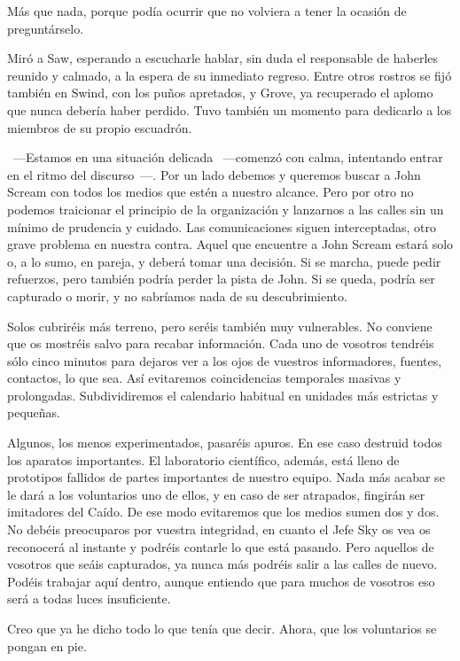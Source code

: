 Más que nada, porque podía ocurrir que no volviera a tener la ocasión de preguntárselo.

Miró a Saw, esperando a escucharle hablar, sin duda el responsable de haberles reunido y calmado, a la espera de su inmediato regreso. Entre otros rostros se fijó también en Swind, con los puños apretados, y Grove, ya recuperado el aplomo que nunca debería haber perdido. Tuvo también un momento para dedicarlo a los miembros de su propio escuadrón.

~---Estamos en una situación delicada ~---comenzó con calma, intentando entrar en el ritmo del discurso~---. Por un lado debemos y queremos buscar a John Scream con todos los medios que estén a nuestro alcance. Pero por otro no podemos traicionar el principio de la organización y lanzarnos a las calles sin un mínimo de prudencia y cuidado. Las comunicaciones siguen interceptadas, otro grave problema en nuestra contra. Aquel que encuentre a John Scream estará solo o, a lo sumo, en pareja, y deberá tomar una decisión. Si se marcha, puede pedir refuerzos, pero también podría perder la pista de John. Si se queda, podría ser capturado o morir, y no sabríamos nada de su descubrimiento.

\rquoti Solos cubriréis más terreno, pero seréis también muy vulnerables. No conviene que os mostréis salvo para recabar información. Cada uno de vosotros tendréis sólo cinco minutos para dejaros ver a los ojos de vuestros informadores, fuentes, contactos, lo que sea. Así evitaremos coincidencias temporales masivas y prolongadas. Subdividiremos el calendario habitual en unidades más estrictas y pequeñas.

\rquoti Algunos, los menos experimentados, pasaréis apuros. En ese caso destruid todos los aparatos importantes. El laboratorio científico, además, está lleno de prototipos fallidos de partes importantes de nuestro equipo. Nada más acabar se le dará a los voluntarios uno de ellos, y en caso de ser atrapados, fingirán ser imitadores del Caído. De ese modo evitaremos que los medios sumen dos y dos. No debéis preocuparos por vuestra integridad, en cuanto el Jefe Sky os vea os reconocerá al instante y podréis contarle lo que está pasando. Pero aquellos de vosotros que seáis capturados, ya nunca más podréis salir a las calles de nuevo. Podéis trabajar aquí dentro, aunque entiendo que para muchos de vosotros eso será a todas luces insuficiente.

\rquoti Creo que ya he dicho todo lo que tenía que decir. Ahora, que los voluntarios se pongan en pie.

